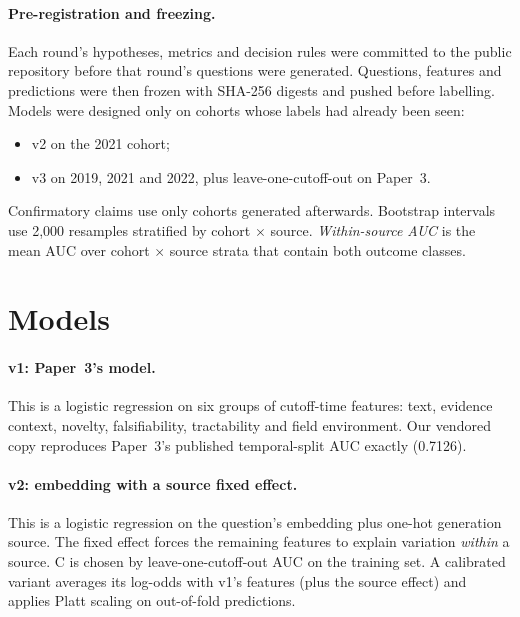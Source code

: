 \documentclass[11pt]{article}
\begin{document}
\paragraph{Pre-registration and freezing.} Each round's hypotheses, metrics and
decision rules were committed to the public repository before that round's
questions were generated. Questions, features and predictions were then frozen
with SHA-256 digests and pushed before labelling. Models were designed only on
cohorts whose labels had already been seen:
\begin{itemize}
\item v2 on the 2021 cohort;
\item v3 on 2019, 2021 and 2022, plus leave-one-cutoff-out on Paper~3.
\end{itemize}
Confirmatory claims use only cohorts generated afterwards. Bootstrap intervals
use 2,000 resamples stratified by cohort $\times$ source.
\emph{Within-source AUC} is the mean AUC over cohort $\times$ source strata
that contain both outcome classes.

\section{Models}\label{sec:models}

\paragraph{v1: Paper~3's model.} This is a logistic regression on six groups of
cutoff-time features: text, evidence context, novelty, falsifiability,
tractability and field environment. Our vendored copy reproduces Paper~3's
published temporal-split AUC exactly (0.7126).

\paragraph{v2: embedding with a source fixed effect.} This is a logistic
regression on the question's embedding plus one-hot generation source. The
fixed effect forces the remaining features to explain variation \emph{within}
a source. C is chosen by leave-one-cutoff-out AUC on the training set. A
calibrated variant averages its log-odds with v1's features (plus the source
effect) and applies Platt scaling on out-of-fold predictions.
\end{document}

